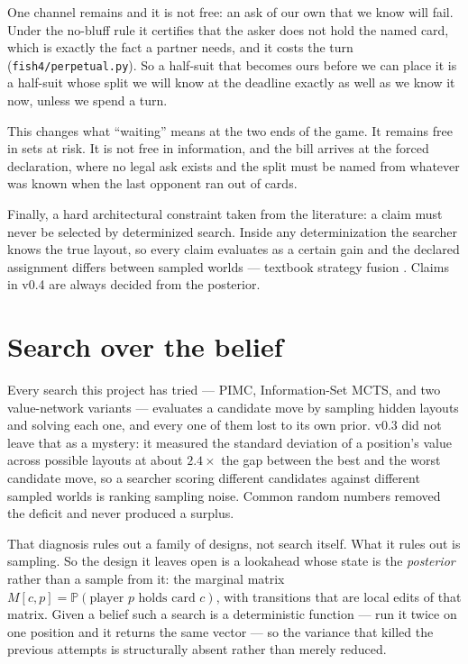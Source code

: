 \documentclass[11pt,a4paper]{article}
\newcommand{\Prob}{\ensuremath{\mathbb{P}}}
\begin{document}
One channel remains and it is not free: an ask of our own that we know will
fail. Under the no-bluff rule it certifies that the asker does not hold the
named card, which is exactly the fact a partner needs, and it costs the turn
(\texttt{fish4/perpetual.py}). So a half-suit that becomes ours before we can
place it is a half-suit whose split we will know at the deadline exactly as
well as we know it now, unless we spend a turn.

This changes what ``waiting'' means at the two ends of the game. It remains
free in sets at risk. It is not free in information, and the bill arrives at
the forced declaration, where no legal ask exists and the split must be named
from whatever was known when the last opponent ran out of cards.

Finally, a hard architectural constraint taken from the literature: a claim must
never be selected by determinized search. Inside any determinization the
searcher knows the true layout, so every claim evaluates as a certain gain and
the declared assignment differs between sampled worlds --- textbook strategy
fusion \citep{frank1998search}. Claims in v0.4 are always decided from the
posterior.

\section{Search over the belief}
\label{sec:lookahead}

Every search this project has tried --- PIMC, Information-Set MCTS, and two
value-network variants --- evaluates a candidate move by sampling hidden layouts
and solving each one, and every one of them lost to its own prior. v0.3 did not
leave that as a mystery: it measured the standard deviation of a position's
value across possible layouts at about $2.4\times$ the gap between the best and
the worst candidate move, so a searcher scoring different candidates against
different sampled worlds is ranking sampling noise. Common random numbers
removed the deficit and never produced a surplus.

That diagnosis rules out a family of designs, not search itself. What it rules
out is sampling. So the design it leaves open is a lookahead whose state is the
\emph{posterior} rather than a sample from it: the marginal matrix
$M[c,p] = \Prob(\text{player } p \text{ holds card } c)$, with transitions that
are local edits of that matrix. Given a belief such a search is a deterministic
function --- run it twice on one position and it returns the same vector --- so
the variance that killed the previous attempts is structurally absent rather
than merely reduced.
\end{document}
